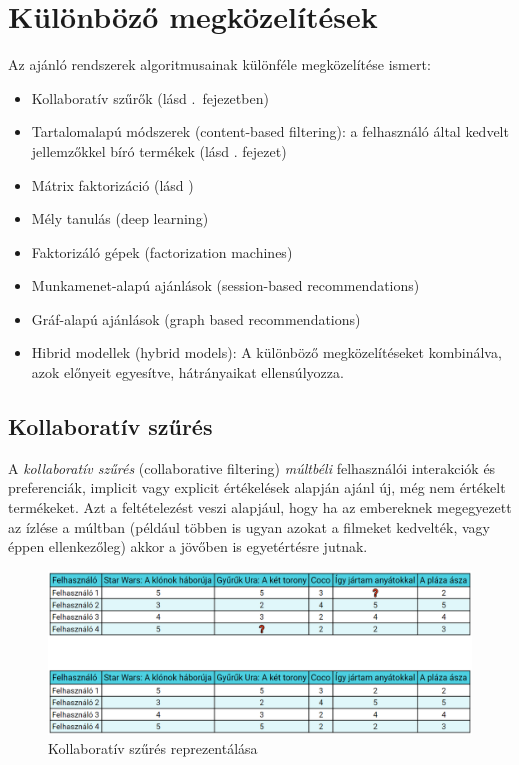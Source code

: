 \documentclass[
]{thesis-ekf}
\theoremstyle{definition}
\theoremstyle{remark}
\begin{document}
\section{Különböző megközelítések}
\label{sec-kulonbozo-megkozelitesek}
Az ajánló rendszerek algoritmusainak különféle megközelítése ismert:
\begin{itemize}
	\item Kollaboratív szűrők (lásd .~fejezetben)
	\item Tartalomalapú módszerek (content-based filtering): a felhasználó által kedvelt jellemzőkkel bíró termékek (lásd . fejezet)
	\item Mátrix faktorizáció (lásd )
	\item Mély tanulás (deep learning)
	\item Faktorizáló gépek (factorization machines)
	\item Munkamenet-alapú ajánlások (session-based recommendations)
	\item Gráf-alapú ajánlások (graph based recommendations)
	\item Hibrid modellek (hybrid models): A különböző megközelítéseket kombinálva, azok előnyeit egyesítve, hátrányaikat ellensúlyozza.
\end{itemize}

\subsection{Kollaboratív szűrés}
\label{subsec-kollaborativ}
A \emph{kollaboratív szűrés} (collaborative filtering) \emph{múltbéli} felhasználói interakciók és preferenciák, implicit vagy explicit értékelések alapján ajánl új, még nem értékelt termékeket. Azt a feltételezést veszi alapjául, hogy ha az embereknek megegyezett az ízlése a múltban (például többen is ugyan azokat a filmeket kedvelték, vagy éppen ellenkezőleg) akkor a jövőben is egyetértésre jutnak.\cite{wiki-recommender-system,werner-ajanlo-rendszer,wiki-collaborative-filtering}
	
\begin{figure}[!h]
	\centering
	\includegraphics[width=14cm]{images/collaborative-filtering.PNG}
	\caption{Kollaboratív szűrés reprezentálása}
	\label{fig-collaborative-filtering}
\end{figure}
\end{document}
